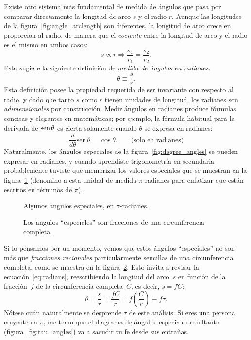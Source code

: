 Existe otro sistema más fundamental de medida de ángulos que pasa por comparar directamente la longitud de arco $s$ y el radio $r$. Aunque las longitudes de la figura~\ref{fig:angle_arclength} son diferentes, la longitud de arco crece en proporción al radio, de manera que el \emph{cociente} entre la longitud de arco y el radio es el mismo en ambos casos:
\[
s\propto r \Rightarrow \frac{s_1}{r_1} = \frac{s_2}{r_2}.
\]
Esto sugiere la siguiente definición de  \emph{medida de ángulos en radianes}:
\begin{equation}
\label{eq:radians}
\theta \equiv \frac{s}{r}.
\end{equation}
Esta definición posee la propiedad requerida de ser invariante con respecto al radio, y dado que tanto  $s$ como $r$ tienen unidades de longitud, los radianes son  \href{https://es.wikipedia.org/wiki/Magnitud_adimensional}{\emph{adimensionales}} por construcción. Medir ángulos en radianes produce fórmulas concisas y elegantes en matemáticas; por ejemplo, la fórmula habitual para la derivada de  $\mbox{sen}\,\theta$ es cierta solamente cuando  $\theta$ se expresa en radianes:
\[
  \frac{d}{d\theta}\mbox{sen}\,\theta = \cos\theta. \qquad\mbox{(solo en radianes)}
\]
Naturalmente, los ángulos especiales de la figura~\ref{fig:degree_angles} se pueden expresar en radianes, y cuando aprendiste trigonometría en secundaria probablemente tuviste que memorizar los valores especiales que se muestran en la figura~\ref{fig:pi_angles} (denomino a esta unidad de medida $\pi$-radianes para enfatizar que están escritos en términos de $\pi$).

\begin{figure}
\begin{center}
\end{center}
\caption{Algunos ángulos especiales, en $\pi$-radianes.\label{fig:pi_angles}}
\end{figure}

\begin{figure}
\begin{center}
\end{center}
\caption{Los ángulos ``especiales'' son fracciones de una circunferencia completa.\label{fig:angle_fractions}}
\end{figure}

Si lo pensamos por un momento, vemos que estos ángulos ``especiales'' no son más que  \emph{fracciones racionales} particularmente sencillas de una circunferencia completa, como se muestra en la figura~\ref{fig:angle_fractions}. Esto invita a revisar la ecuación~\eqref{eq:radians}, reescribiendo la longitud del arco~$s$ en función de la fracción~$f$ de la circunferencia completa~$C$, es decir, $s = f C$:
\begin{equation}
\label{eq:circle_fraction}
\theta = \frac{s}{r} = \frac{fC}{r} =  f\left(\frac{C}{r}\right) \equiv f\tau.
\end{equation}
Nótese cuán naturalmente se desprende $\tau$ de este análisis. Si eres una persona creyente en $\pi$, me temo que el diagrama  de ángulos especiales resultante (figura~\ref{fig:tau_angles}) va a sacudir tu fe desde sus entrañas.

